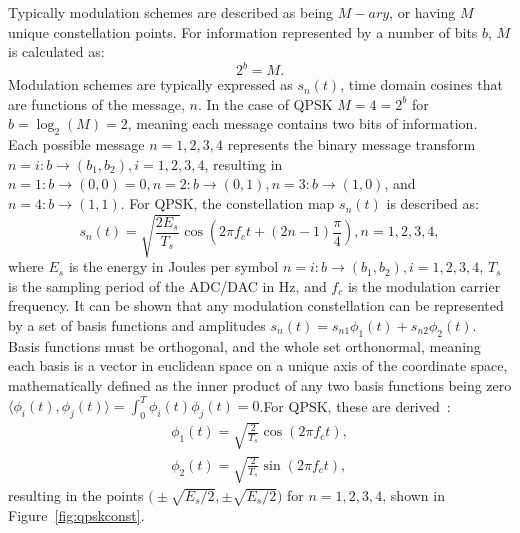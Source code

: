 Typically modulation schemes are described as being $M-ary$, or having $M$ unique constellation points. For information represented by a number of bits $b$, $M$ is calculated as:
\begin{equation}
\label{eq:mary}
2^b = M.
\end{equation}
Modulation schemes are typically expressed as $s_n(t)$, time domain cosines that are functions of the message, $n$. In the case of QPSK $M = 4 = 2^b$ for $b = \log_2(M) = 2$, meaning each message contains two bits of information. Each possible message $n=1,2,3,4$ represents the binary message transform $n = i : b \rightarrow (b_1, b_2), i=1,2,3,4$, resulting in $n=1 : b \rightarrow (0, 0) = 0, n=2 : b \rightarrow (0, 1), n=3 : b \rightarrow (1, 0)$, and $n=4 : b \rightarrow (1, 1)$. For QPSK, the constellation map $s_n(t)$ is described as:
\begin{equation}
\label{eq:qpsk}
s_n(t) = \sqrt{\frac{2 E_s}{T_s}} \cos(2\pi f_c t + (2n-1)\frac{\pi}{4}), n=1,2,3,4,
\end{equation}
where $E_s$ is the energy in Joules per symbol $n = i : b \rightarrow (b_1, b_2), i=1,2,3,4$, $T_s$ is the sampling period of the ADC/DAC in Hz, and $f_c$ is the modulation carrier frequency. It can be shown that any modulation constellation can be represented by a set of basis functions and amplitudes $s_n(t)=s_{n1} \phi_1(t) + s_{n2} \phi_2(t)$. Basis functions must be orthogonal, and the whole set orthonormal, meaning each basis is a vector in euclidean space on a unique axis of the coordinate space, mathematically defined as the inner product of any two basis functions being zero $\langle \phi_i(t), \phi_j(t) \rangle = \int_0^T \phi_i(t) \phi_j(t) = 0$.For QPSK, these are derived~\cite{rappaport1996wireless}:
\begin{subequations}
\label{eq:basisfun}
\begin{align}
\phi_1(t) = \sqrt{\frac{2}{T_s}} \cos(2\pi f_c t),
\\
\phi_2(t) = \sqrt{\frac{2}{T_s}} \sin(2\pi f_c t),
\end{align}
\end{subequations}
resulting in the points $\big(\pm \sqrt{E_s/2}, \pm \sqrt{E_s/2} \big)$ for $n=1,2,3,4$, shown in Figure~\ref{fig:qpskconst}.
